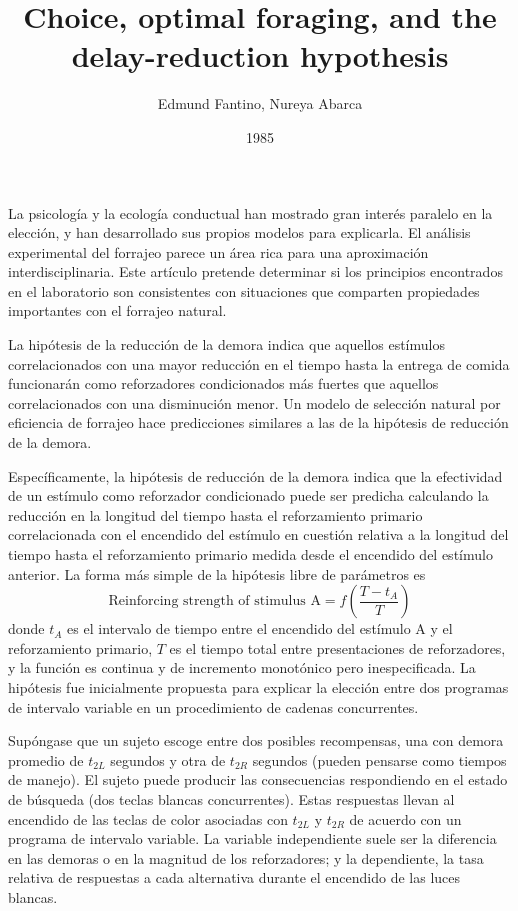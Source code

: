 \documentclass[a4paper,12pt]{article}
\title{Choice, optimal foraging, and the delay-reduction hypothesis}
\author{Edmund Fantino, Nureya Abarca}
\date{1985}
\begin{document}
{\scshape\bfseries \maketitle}

La psicología y la ecología conductual han mostrado gran interés paralelo en la elección, y han desarrollado sus propios modelos para explicarla. El análisis experimental del forrajeo parece un área rica para una aproximación interdisciplinaria. Este artículo pretende determinar si los principios encontrados en el laboratorio son consistentes con situaciones que comparten propiedades importantes con el forrajeo natural.

La hipótesis de la reducción de la demora indica que aquellos estímulos correlacionados con una mayor reducción en el tiempo hasta la entrega de comida funcionarán como reforzadores condicionados más fuertes que aquellos correlacionados con una disminución menor. Un modelo de selección natural por eficiencia de forrajeo hace predicciones similares a las de la hipótesis de reducción de la demora.

Específicamente, la hipótesis de reducción de la demora indica que la efectividad de un estímulo como reforzador condicionado puede ser predicha calculando la reducción en la longitud del tiempo hasta el reforzamiento primario correlacionada con el encendido del estímulo en cuestión relativa a la longitud del tiempo hasta el reforzamiento primario medida desde el encendido del estímulo anterior. La forma más simple de la hipótesis libre de parámetros es
\begin{equation}
\mbox{Reinforcing strength of stimulus A}=f\left(\frac{T-t_A}{T}\right)
\end{equation}
donde $t_A$ es el intervalo de tiempo entre el encendido del estímulo A y el reforzamiento primario, $T$ es el tiempo total entre presentaciones de reforzadores, y la función es continua y de incremento monotónico pero inespecificada. La hipótesis fue inicialmente propuesta para explicar la elección entre dos programas de intervalo variable en un procedimiento de cadenas concurrentes.

Supóngase que un sujeto escoge entre dos posibles recompensas, una con demora promedio de $t_{2L}$ segundos y otra de $t_{2R}$ segundos (pueden pensarse como tiempos de manejo). El sujeto puede producir las consecuencias respondiendo en el estado de búsqueda (dos teclas blancas concurrentes). Estas respuestas llevan al encendido de las teclas de color asociadas con $t_{2L}$ y $t_{2R}$ de acuerdo con un programa de intervalo variable. La variable independiente suele ser la diferencia en las demoras o en la magnitud de los reforzadores; y la dependiente, la tasa relativa de respuestas a cada alternativa durante el encendido de las luces blancas.
\end{document}
